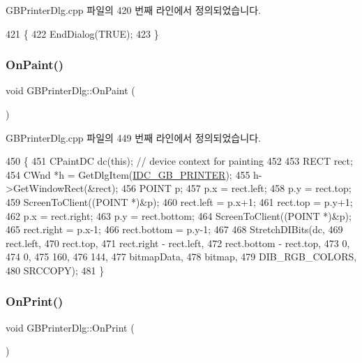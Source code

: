 G\+B\+Printer\+Dlg.\+cpp 파일의 420 번째 라인에서 정의되었습니다.


\begin{DoxyCode}
421 \{
422   EndDialog(TRUE);
423 \}
\end{DoxyCode}
\mbox{\label{class_g_b_printer_dlg_a07a9791b8dc7695afcaa02abada894db}} 
\subsubsection{\texorpdfstring{On\+Paint()}{OnPaint()}}
{\footnotesize\ttfamily void G\+B\+Printer\+Dlg\+::\+On\+Paint (\begin{DoxyParamCaption}{ }\end{DoxyParamCaption})\hspace{0.3cm}{\ttfamily [protected]}}



G\+B\+Printer\+Dlg.\+cpp 파일의 449 번째 라인에서 정의되었습니다.


\begin{DoxyCode}
450 \{
451   CPaintDC dc(\textcolor{keyword}{this}); \textcolor{comment}{// device context for painting}
452   
453   RECT rect;
454   CWnd *h = GetDlgItem(\mbox{\hyperlink{resource_8h_aec708d4bde72dc2475a325093c74eccf}{IDC\_GB\_PRINTER}});
455   h->GetWindowRect(&rect);
456   POINT p;
457   p.x = rect.left;
458   p.y = rect.top;
459   ScreenToClient((POINT *)&p);
460   rect.left = p.x+1;
461   rect.top = p.y+1;
462   p.x = rect.right;
463   p.y = rect.bottom;
464   ScreenToClient((POINT *)&p);
465   rect.right = p.x-1;
466   rect.bottom = p.y-1;
467   
468   StretchDIBits(dc,
469                 rect.left,
470                 rect.top,
471                 rect.right - rect.left,
472                 rect.bottom - rect.top,
473                 0,
474                 0,
475                 160,
476                 144,
477                 bitmapData,
478                 bitmap,
479                 DIB\_RGB\_COLORS,
480                 SRCCOPY);
481 \}
\end{DoxyCode}
\mbox{\label{class_g_b_printer_dlg_ac778254287374af1e218e778bdde4f26}} 
\subsubsection{\texorpdfstring{On\+Print()}{OnPrint()}}
{\footnotesize\ttfamily void G\+B\+Printer\+Dlg\+::\+On\+Print (\begin{DoxyParamCaption}{ }\end{DoxyParamCaption})\hspace{0.3cm}{\ttfamily [protected]}}



